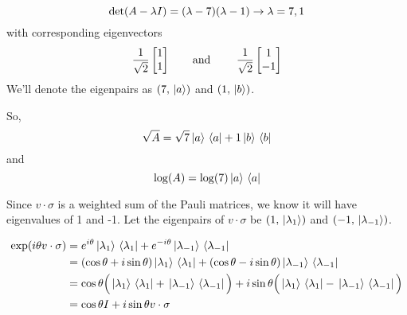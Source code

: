$$\operatorname{det}(A - \lambda I) = (\lambda - 7)(\lambda - 1) \rightarrow \lambda = 7, 1$$
with corresponding eigenvectors 
$$\frac{1}{\sqrt{2}} \begin{bmatrix}
1 \\
1
\end{bmatrix} \text{\qquad and \qquad} \frac{1}{\sqrt{2}}	 \begin{bmatrix}
1 \\
-1
\end{bmatrix}$$
We'll denote the eigenpairs as $(7, \ket*{a})$ and $(1, \ket*{b})$.  

So, 
$$\sqrt{A} = \sqrt{7} \ket*{a} \bra*{a} + 1 \ket*{b} \bra*{b}$$
and 
$$\log (A) = \log (7) \ket*{a} \bra*{a}$$

\exercise
Since $v \cdot \sigma$ is a weighted sum of the Pauli matrices, we know it will have eigenvalues of 1 and -1. Let the eigenpairs of $v \cdot \sigma$ be $(1, \ket*{\lambda_{1}})$ and $(-1, \ket*{\lambda_{-1}})$. 

$$
\begin{aligned}
\exp (i \theta v \cdot \sigma) &= e^{i \theta} \ket*{\lambda_{1}} \bra*{\lambda_{1}} + e^{-i \theta} \ket*{\lambda_{-1}} \bra*{\lambda_{-1}} \\
&= (\cos \theta + i \sin \theta) \ket*{\lambda_{1}} \bra*{\lambda_{1}} + (\cos \theta - i \sin \theta) \ket*{\lambda_{-1}} \bra*{\lambda_{-1}} \\
&= \cos \theta \Big( \ket*{\lambda_{1}} \bra*{\lambda_{1}} + \ket*{\lambda_{-1}} \bra*{\lambda_{-1}} \Big) + i \sin \theta \Big(\ket*{\lambda_{1}} \bra*{\lambda_{1}} - \ket*{\lambda_{-1}} \bra*{\lambda_{-1}} \Big) \\
&= \cos \theta I + i \sin \theta v \cdot \sigma 
\end{aligned}
$$